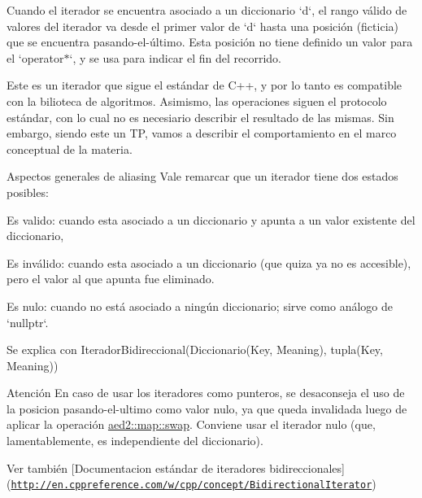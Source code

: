 \-Cuando el iterador se encuentra asociado a un diccionario `d`, el rango válido de valores del iterador va desde el primer valor de `d` hasta una posición (ficticia) que se encuentra pasando-\/el-\/último. \-Esta posición no tiene definido un valor para el `operator$\ast$`, y se usa para indicar el fin del recorrido.

\-Este es un iterador que sigue el estándar de \-C++, y por lo tanto es compatible con la bilioteca de algoritmos. \-Asimismo, las operaciones siguen el protocolo estándar, con lo cual no es necesiario describir el resultado de las mismas. \-Sin embargo, siendo este un \-T\-P, vamos a describir el comportamiento en el marco conceptual de la materia.

\begin{DoxyParagraph}{\-Aspectos generales de aliasing}
\-Vale remarcar que un iterador tiene dos estados posibles\-:
\begin{DoxyEnumerate}
\item \-Es valido\-: cuando esta asociado a un diccionario y apunta a un valor existente del diccionario,
\item \-Es inválido\-: cuando esta asociado a un diccionario (que quiza ya no es accesible), pero el valor al que apunta fue eliminado.
\item \-Es nulo\-: cuando no está asociado a ningún diccionario; sirve como análogo de `nullptr`. 
\end{DoxyEnumerate}
\end{DoxyParagraph}
\begin{DoxyParagraph}{\-Se explica con}
\-Iterador\-Bidireccional(\-Diccionario(\-Key, \-Meaning), tupla(\-Key, \-Meaning))
\end{DoxyParagraph}
\begin{DoxyAttention}{\-Atención}
\-En caso de usar los iteradores como punteros, se desaconseja el uso de la posicion pasando-\/el-\/ultimo como valor nulo, ya que queda invalidada luego de aplicar la operación \hyperlink{classaed2_1_1map_a43ddb71cc91e5c6021a7a1f243d6cc4a_a43ddb71cc91e5c6021a7a1f243d6cc4a}{aed2\-::map\-::swap}. \-Conviene usar el iterador nulo (que, lamentablemente, es independiente del diccionario).
\end{DoxyAttention}
\begin{DoxySeeAlso}{\-Ver también}
\mbox{[}\-Documentacion estándar de iteradores bidireccionales\mbox{]}(\href{http://en.cppreference.com/w/cpp/concept/BidirectionalIterator}{\tt http\-://en.\-cppreference.\-com/w/cpp/concept/\-Bidirectional\-Iterator}) 
\end{DoxySeeAlso}


